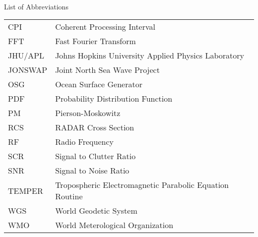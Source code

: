 

\renewcommand{\baselinestretch}{1}
\small\normalsize
\hbox{\ }

\vspace{-4em}

\begin{center}
\large{List of Abbreviations}
\end{center} 

\vspace{3pt}

\begin{supertabular}{ll}
CPI & Coherent Processing Interval \\
FFT & Fast Fourier Transform \\
JHU/APL & Johns Hopkins University Applied Physics Laboratory \\
JONSWAP & Joint North Sea Wave Project\\
OSG & Ocean Surface Generator \\
PDF & Probability Distribution Function \\
PM & Pierson-Moskowitz \\
RCS & RADAR Cross Section \\
RF & Radio Frequency \\
SCR & Signal to Clutter Ratio \\
SNR & Signal to Noise Ratio\\
TEMPER & Tropospheric Electromagnetic Parabolic Equation Routine \\
WGS & World Geodetic System \\
WMO & World Meterological Organization \\
\end{supertabular}
